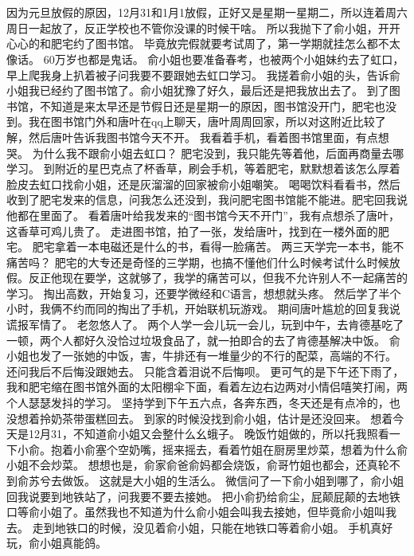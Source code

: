 \chapter{}
因为元旦放假的原因，12月31和1月1放假，正好又是星期一星期二，所以连着周六周日一起放了，反正学校也不管你没课的时候干啥。
所以我抛下了俞小姐，开开心心的和肥宅约了图书馆。
毕竟放完假就要考试周了，第一学期就挂怎么都不太像话。
60万岁也都是鬼话。
俞小姐也要准备春考，也被两个小姐妹约去了虹口，早上爬我身上扒着被子问我要不要跟她去虹口学习。
我搓着俞小姐的头，告诉俞小姐我已经约了图书馆了。俞小姐犹豫了好久，最后还是把我放出去了。
到了图书馆，不知道是来太早还是节假日还是星期一的原因，图书馆没开门，肥宅也没到。我在图书馆门外和唐叶在qq上聊天，唐叶周周回家，所以对这附近比较了解，然后唐叶告诉我图书馆今天不开。
我看着手机，看着图书馆里面，有点想哭。
为什么我不跟俞小姐去虹口？
肥宅没到，我只能先等着他，后面再商量去哪学习。
到附近的星巴克点了杯香草，刷会手机，等着肥宅，默默想着该怎么厚着脸皮去虹口找俞小姐，还是灰溜溜的回家被俞小姐嘲笑。
喝喝饮料看看书，然后收到了肥宅发来的信息，问我怎么还没到，我问肥宅图书馆能不能进。肥宅回我说他都在里面了。
看着唐叶给我发来的“图书馆今天不开门”，我有点想杀了唐叶，这香草可鸡儿贵了。
走进图书馆，拍了一张，发给唐叶，找到在一楼外面的肥宅。
肥宅拿着一本电磁还是什么的书，看得一脸痛苦。
两三天学完一本书，能不痛苦吗？
肥宅的大专还是奇怪的三学期，也搞不懂他们什么时候考试什么时候放假。反正他现在要学，这就够了，我学的痛苦可以，但我不允许别人不一起痛苦的学习。
掏出高数，开始复习，还要学微经和C语言，想想就头疼。
然后学了半个小时，我俩不约而同的掏出了手机，开始联机玩游戏。
期间唐叶尴尬的回复我说谎报军情了。
老忽悠人了。
两个人学一会儿玩一会儿，玩到中午，去肯德基吃了一顿，两个人都好久没恰过垃圾食品了，就一拍即合的去了肯德基解决中饭。
俞小姐也发了一张她的中饭，害，牛排还有一堆量少的不行的配菜，高端的不行。
还问我后不后悔没跟她去。
只能含着泪说不后悔呗。
更可气的是下午还下雨了，我和肥宅缩在图书馆外面的太阳棚伞下面，看着左边右边两对小情侣嘻笑打闹，两个人瑟瑟发抖的学习。
坚持学到下午五六点，各奔东西，冬天还是有点冷的，也没想着拎奶茶带蛋糕回去。
到家的时候没找到俞小姐，估计是还没回来。 想着今天是12月31，不知道俞小姐又会整什么幺蛾子。
晚饭竹姐做的，所以托我照看一下小俞。抱着小俞塞个空奶嘴，摇来摇去，看着竹姐在厨房里炒菜，想着为什么俞小姐不会炒菜。
想想也是，俞家俞爸俞妈都会烧饭，俞哥竹姐也都会，还真轮不到俞苏兮去做饭。
这就是大小姐的生活么。
微信问了一下俞小姐到哪了，俞小姐回我说要到地铁站了，问我要不要去接她。
把小俞扔给俞尘，屁颠屁颠的去地铁口等俞小姐了。虽然我也不知道为什么俞小姐会叫我去接她，但毕竟俞小姐叫我去。
走到地铁口的时候，没见着俞小姐，只能在地铁口等着俞小姐。
手机真好玩，俞小姐真能鸽。
